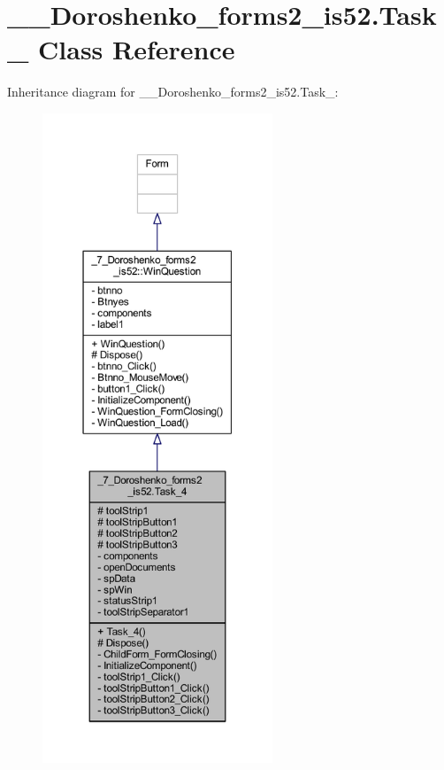 \hypertarget{class__7___doroshenko__forms2__is52_1_1_task__4}{}\section{\+\_\+\_\+\+Doroshenko\+\_\+forms2\+\_\+is52.\+Task\+\_ Class Reference}
\label{class__7___doroshenko__forms2__is52_1_1_task__4}


Inheritance diagram for \+\_\+\_\+\+Doroshenko\+\_\+forms2\+\_\+is52.\+Task\+\_\+:
\nopagebreak
\begin{figure}[H]
\begin{center}
\leavevmode
\includegraphics[height=550pt]{class__7___doroshenko__forms2__is52_1_1_task__4__inherit__graph}
\end{center}
\end{figure}


